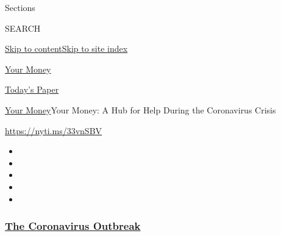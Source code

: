 Sections

SEARCH

\protect\hyperlink{site-content}{Skip to
content}\protect\hyperlink{site-index}{Skip to site index}

\href{https://www.nytimes3xbfgragh.onion/section/your-money}{Your Money}

\href{https://myaccount.nytimes3xbfgragh.onion/auth/login?response_type=cookie\&client_id=vi}{}

\href{https://www.nytimes3xbfgragh.onion/section/todayspaper}{Today's
Paper}

\href{/section/your-money}{Your Money}\textbar{}Your Money: A Hub for
Help During the Coronavirus Crisis

\url{https://nyti.ms/33vnSBV}

\begin{itemize}
\item
\item
\item
\item
\item
\end{itemize}

\hypertarget{the-coronavirus-outbreak}{%
\subsubsection{\texorpdfstring{\href{https://www.nytimes3xbfgragh.onion/news-event/coronavirus?name=styln-coronavirus\&region=TOP_BANNER\&block=storyline_menu_recirc\&action=click\&pgtype=Article\&impression_id=eb73acb0-f4c6-11ea-b7e2-937559d5cb01\&variant=undefined}{The
Coronavirus
Outbreak}}{The Coronavirus Outbreak}}\label{the-coronavirus-outbreak}}

